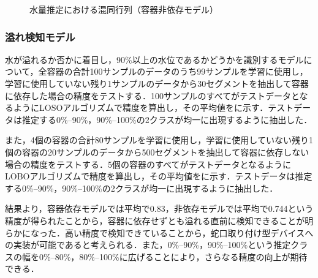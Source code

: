 \documentclass[submit,techrep,noauthor]{ipsj}
\begin{document}
\begin{figure}[!t]
\begin{minipage}[t]{0.32\linewidth}
  \end{minipage}
  \caption{水量推定における混同行列（容器非依存モデル）}
  \label{fig:confusion_matrix_10_independent}
\end{figure}

\subsubsection{溢れ検知モデル}
水が溢れるか否かに着目し，90\%以上の水位であるかどうかを識別するモデルについて，全容器の合計100サンプルのデータのうち99サンプルを学習に使用し，学習に使用していない残り1サンプルのデータから30セグメントを抽出して容器に依存した場合の精度をテストする．100サンプルのすべてがテストデータとなるようにLOSOアルゴリズムで精度を算出し，その平均値をに示す．テストデータは推定する0\%--90\%，90\%--100\%の2クラスが均一に出現するように抽出した．\par

また，4個の容器の合計80サンプルを学習に使用し，学習に使用していない残り1個の容器の20サンプルのデータから500セグメントを抽出して容器に依存しない場合の精度をテストする．5個の容器のすべてがテストデータとなるようにLOBOアルゴリズムで精度を算出し，その平均値をに示す．テストデータは推定する0\%--90\%，90\%--100\%の2クラスが均一に出現するように抽出した．\par

結果より，容器依存モデルでは平均で0.83，非依存モデルでは平均で0.744という精度が得られたことから，容器に依存せずとも溢れる直前に検知できることが明らかになった．高い精度で検知できていることから，蛇口取り付け型デバイスへの実装が可能であると考えられる．また，0\%--90\%，90\%--100\%という推定クラスの幅を0\%--80\%，80\%--100\%に広げることにより，さらなる精度の向上が期待できる．
\end{document}
